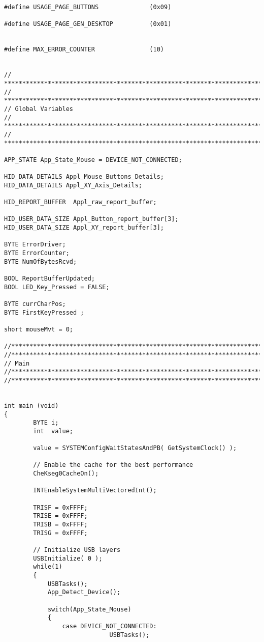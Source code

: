 \documentclass{article}
\begin{document}
\begin{verbatim}
#define USAGE_PAGE_BUTTONS              (0x09)

#define USAGE_PAGE_GEN_DESKTOP          (0x01)


#define MAX_ERROR_COUNTER               (10)


// *****************************************************************************
// *****************************************************************************
// Global Variables
// *****************************************************************************
// *****************************************************************************

APP_STATE App_State_Mouse = DEVICE_NOT_CONNECTED;

HID_DATA_DETAILS Appl_Mouse_Buttons_Details;
HID_DATA_DETAILS Appl_XY_Axis_Details;

HID_REPORT_BUFFER  Appl_raw_report_buffer;

HID_USER_DATA_SIZE Appl_Button_report_buffer[3];
HID_USER_DATA_SIZE Appl_XY_report_buffer[3];

BYTE ErrorDriver;
BYTE ErrorCounter;
BYTE NumOfBytesRcvd;

BOOL ReportBufferUpdated;
BOOL LED_Key_Pressed = FALSE;

BYTE currCharPos;
BYTE FirstKeyPressed ;

short mouseMvt = 0;

//******************************************************************************
//******************************************************************************
// Main
//******************************************************************************
//******************************************************************************


int main (void)
{
    	BYTE i;
        int  value;
    
        value = SYSTEMConfigWaitStatesAndPB( GetSystemClock() );
    
        // Enable the cache for the best performance
        CheKseg0CacheOn();
    
        INTEnableSystemMultiVectoredInt();
            
        TRISF = 0xFFFF;
  		TRISE = 0xFFFF;
  		TRISB = 0xFFFF;
  		TRISG = 0xFFFF;
        
        // Initialize USB layers
        USBInitialize( 0 );
        while(1)
        {
            USBTasks();
            App_Detect_Device();
            
            switch(App_State_Mouse)
            {
                case DEVICE_NOT_CONNECTED:
                             USBTasks();
                             

\end{verbatim}
\end{document}
